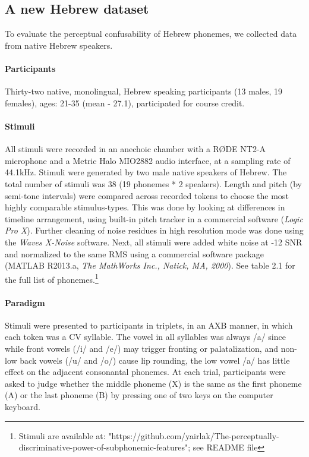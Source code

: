 \subsection{A new Hebrew dataset}
To evaluate the perceptual confusability of Hebrew phonemes, we collected data from native Hebrew speakers.

\paragraph{Participants}
Thirty-two native, monolingual, Hebrew speaking participants (13 males, 19 females), ages: 21-35 (mean - 27.1), participated for course credit.

\paragraph{Stimuli}
All stimuli were recorded in an anechoic chamber with a RØDE NT2-A microphone and a Metric Halo MIO2882 audio interface, at a sampling rate of 44.1kHz. Stimuli were generated by two male native speakers of Hebrew. The total number of stimuli was 38 (19 phonemes * 2 speakers). Length and pitch (by semi-tone intervals) were compared across recorded tokens to choose the most highly comparable stimulus-types. This was done by looking at differences in timeline arrangement, using built-in pitch tracker in a commercial software (\textit{Logic Pro X}). Further cleaning of noise residues in high resolution mode was done using the \textit{Waves X-Noise} software. Next, all stimuli were added white noise at -12 SNR and normalized to the same RMS using a commercial software package (MATLAB R2013.a, \textit{The MathWorks Inc., Natick, MA, 2000}). See table 2.1 for the full list of phonemes.\footnote{Stimuli are available at: "https://github.com/yairlak/The-perceptually-discriminative-power-of-subphonemic-features"; see README file}

\paragraph{Paradigm}
Stimuli were presented to participants in triplets, in an AXB manner, in which each token was a CV syllable. The vowel in all syllables was always /a/ since while front vowels (/i/ and /e/) may trigger fronting or palatalization, and non-low back vowels (/u/ and /o/) cause lip rounding, the low vowel /a/ has little effect on the adjacent consonantal phonemes. At each trial, participants were asked to judge whether the middle phoneme (X) is the same as the first phoneme (A) or the last phoneme (B) by pressing one of two keys on the computer keyboard.

